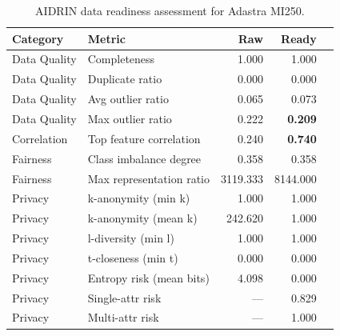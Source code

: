 \begin{table}[t]
\centering
\caption{AIDRIN data readiness assessment for Adastra MI250.}
\label{tab:aidrin_adastra}
\setlength{\tabcolsep}{4pt}
\begin{tabular}{llrrl}
\toprule
\textbf{Category} & \textbf{Metric} & \textbf{Raw} & \textbf{Ready} \\
\midrule
  Data Quality & Completeness & 1.000 & 1.000 \\
  Data Quality & Duplicate ratio & 0.000 & 0.000 \\
  Data Quality & Avg outlier ratio & 0.065 & 0.073 \\
  Data Quality & Max outlier ratio & 0.222 & \textbf{0.209} \\
\midrule
  Correlation & Top feature correlation & 0.240 & \textbf{0.740} \\
\midrule
  Fairness & Class imbalance degree & 0.358 & 0.358 \\
  Fairness & Max representation ratio & 3119.333 & 8144.000 \\
\midrule
  Privacy & k-anonymity (min k) & 1.000 & 1.000 \\
  Privacy & k-anonymity (mean k) & 242.620 & 1.000 \\
  Privacy & l-diversity (min l) & 1.000 & 1.000 \\
  Privacy & t-closeness (min t) & 0.000 & 0.000 \\
  Privacy & Entropy risk (mean bits) & 4.098 & 0.000 \\
  Privacy & Single-attr risk & — & 0.829 \\
  Privacy & Multi-attr risk & — & 1.000 \\
\bottomrule
\end{tabular}
\end{table}
